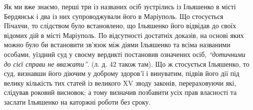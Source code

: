 \documentclass[a4paper,20pt]{report}
\begin{document}
Як ми вже знаємо, перші три із названих осіб зустрілись із Ільяшенко в місті Бердянськ і два із
них супроводжували його в Маріуполь. Що стосується Пічахчи, то слідством було встановлено, що Ільяшенко
його відвідав до своїх відомих дій в місті Маріуполь. По відсутності достатніх доказів, на основі яких
можно було би встановити зв'язок між діями Ільяшенко та всіма названими особами, уїздний суд у своєму 
вердикті постановив означених осіб, \emph{``дотичними до сієї справи не вважати''}. (л. д. 42 також там).
Що ж стосується Ільяшенко, то суд, визнавши його діючим у доброму здоров'ї і винуватим, підвів
його дії під велику кількість тих статей із великого XV зводу законів, перераховуючи які, слідував роковий висновок;
а тому визначив позбавити усіх прав власності та заслати Ільяшенко на каторжні роботи без сроку.
\end{document}
